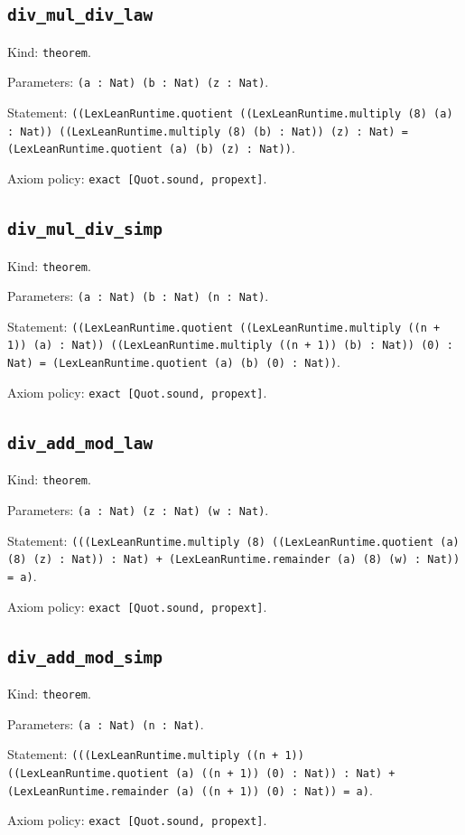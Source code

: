 \documentclass[11pt]{article}
\begin{document}
\subsection*{\texttt{div\_mul\_div\_law}}
\noindent Kind: \texttt{theorem}.\par
\noindent Parameters: \texttt{(a : Nat) (b : Nat) (z : Nat)}.\par
\noindent Statement: \texttt{((LexLeanRuntime.quotient ((LexLeanRuntime.multiply (8) (a) : Nat)) ((LexLeanRuntime.multiply (8) (b) : Nat)) (z) : Nat) = (LexLeanRuntime.quotient (a) (b) (z) : Nat))}.\par
\noindent Axiom policy: \texttt{exact [Quot.sound, propext]}.\par
\subsection*{\texttt{div\_mul\_div\_simp}}
\noindent Kind: \texttt{theorem}.\par
\noindent Parameters: \texttt{(a : Nat) (b : Nat) (n : Nat)}.\par
\noindent Statement: \texttt{((LexLeanRuntime.quotient ((LexLeanRuntime.multiply ((n + 1)) (a) : Nat)) ((LexLeanRuntime.multiply ((n + 1)) (b) : Nat)) (0) : Nat) = (LexLeanRuntime.quotient (a) (b) (0) : Nat))}.\par
\noindent Axiom policy: \texttt{exact [Quot.sound, propext]}.\par
\subsection*{\texttt{div\_add\_mod\_law}}
\noindent Kind: \texttt{theorem}.\par
\noindent Parameters: \texttt{(a : Nat) (z : Nat) (w : Nat)}.\par
\noindent Statement: \texttt{(((LexLeanRuntime.multiply (8) ((LexLeanRuntime.quotient (a) (8) (z) : Nat)) : Nat) + (LexLeanRuntime.remainder (a) (8) (w) : Nat)) = a)}.\par
\noindent Axiom policy: \texttt{exact [Quot.sound, propext]}.\par
\subsection*{\texttt{div\_add\_mod\_simp}}
\noindent Kind: \texttt{theorem}.\par
\noindent Parameters: \texttt{(a : Nat) (n : Nat)}.\par
\noindent Statement: \texttt{(((LexLeanRuntime.multiply ((n + 1)) ((LexLeanRuntime.quotient (a) ((n + 1)) (0) : Nat)) : Nat) + (LexLeanRuntime.remainder (a) ((n + 1)) (0) : Nat)) = a)}.\par
\noindent Axiom policy: \texttt{exact [Quot.sound, propext]}.\par
\end{document}
